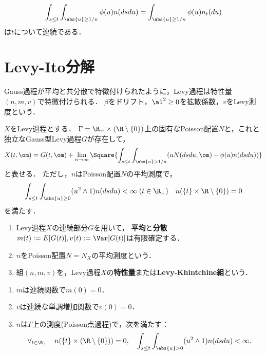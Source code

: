 \documentclass[uplatex,dvipdfmx]{jsreport}
\begin{document}
\begin{lemma}
    \[\int_{s\le t}\int_{\abs{u}\ge 1/n}\phi(u)n(dsdu)=\int_{\abs{u}\ge 1/n}\phi(u)n_t(du)\]
    は$t$について連続である．
\end{lemma}

\section{Levy-Ito分解}

\begin{tcolorbox}[colframe=ForestGreen, colback=ForestGreen!10!white,breakable,colbacktitle=ForestGreen!40!white,coltitle=black,fonttitle=\bfseries\sffamily,
title=]
    Gauss過程が平均と共分散で特徴付けられたように，Levy過程は特性量$(n,m,v)$で特徴付けられる．
    $\beta$をドリフト，$\al^2\ge0$を拡散係数，$v$をLevy測度という．
\end{tcolorbox}

\begin{theorem}
    $X$をLevy過程とする．
    $\Gamma=\R_+\times(\R\setminus\{0\})$上の固有なPoisson配置$N$と，これと独立なGauss型Levy過程$G$が存在して，
    \[X(t,\om)=G(t,\om)+\lim_{n\to\infty}\Square{\int_{s\le t}\int_{\abs{u}>1/n}(uN(dsdu,\om)-\phi(u)n(dsdu))}\]
    と表せる．
    ただし，$n$はPoisson配置$N$の平均測度で，
    \[\int_{s\le t}\int_{\abs{u}\ge0}(u^2\land 1)n(dsdu)<\infty\;(t\in\R_+)\quad n(\{t\}\times\R\setminus\{0\})=0\]
    を満たす．
\end{theorem}

\begin{definition}\mbox{}
    \begin{enumerate}
        \item Levy過程$X$の連続部分$G$を用いて，
        \textbf{平均}と\textbf{分散}$m(t):=E[G(t)],v(t):=\Var[G(t)]$は有限確定する．
        \item $n$をPoisson配置$N=N_X$の平均測度という．
        \item 組$(n,m,v)$を，Levy過程$X$の\textbf{特性量}または\textbf{Levy-Khintchine組}という．
    \end{enumerate}
\end{definition}

\begin{lemma}\mbox{}
    \begin{enumerate}
        \item $m$は連続関数で$m(0)=0$．
        \item $v$は連続な単調増加関数で$v(0)=0$．
        \item $n$は$\Gamma$上の測度(Poisson点過程)で，次を満たす：
        \[\forall_{t\in\R_+}\quad n(\{t\}\times(\R\setminus\{0\}))=0,\quad\int_{s\le t}\int_{\abs{u}>0}(u^2\land 1)n(dsdu)<\infty.\]
    \end{enumerate}
\end{lemma}
\end{document}
